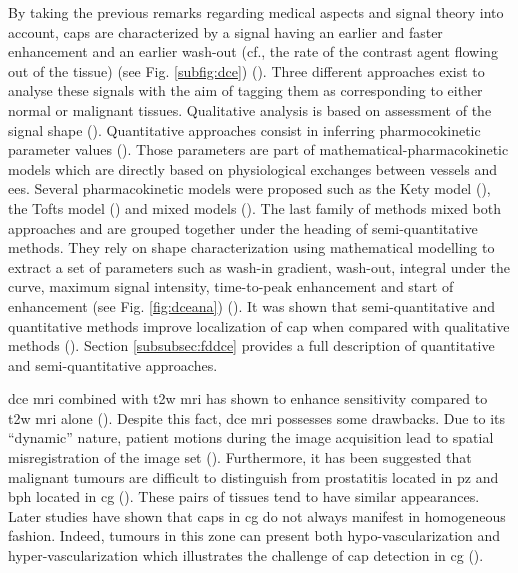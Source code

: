 \begin{enumerate}[leftmargin=*]
By taking the previous remarks regarding medical aspects and signal theory into account, \acp{cap} are characterized by a signal having an earlier and faster enhancement and an earlier wash-out (cf., the rate of the contrast agent flowing out of the tissue) (see Fig. \ref{subfig:dce}) (\cite{Verma2012}). Three different approaches exist to analyse these signals with the aim of tagging them as corresponding to either normal or malignant tissues. Qualitative analysis is based on assessment of the signal shape (\cite{Hoeks2011}). Quantitative approaches consist in inferring pharmocokinetic parameter values (\cite{Tofts2010}). Those parameters are part of mathematical-pharmacokinetic models which are directly based on physiological exchanges between vessels and \ac{ees}. Several pharmacokinetic models were proposed such as the Kety model (\cite{Kety1951}), the Tofts model (\cite{Tofts1997}) and mixed models (\cite{Larsson1996,StLawrence1998}). The last family of methods mixed both approaches and are grouped together under the heading of semi-quantitative methods. They rely on shape characterization using mathematical modelling to extract a set of parameters such as wash-in gradient, wash-out, integral under the curve, maximum signal intensity, time-to-peak enhancement and start of enhancement (see Fig. \ref{fig:dceana}) (\cite{Hoeks2011,Verma2012}). It was shown that semi-quantitative and quantitative methods improve localization of \ac{cap} when compared with qualitative methods (\cite{Rosenkrantz2013}). Section \ref{subsubsec:fddce} provides a full description of quantitative and semi-quantitative approaches.

\ac{dce} \ac{mri} combined with \ac{t2w} \ac{mri} has shown to enhance sensitivity compared to \ac{t2w} \ac{mri} alone (\cite{Jager1997,Kim2005,Schlemmer2004,Zelhof2009}). Despite this fact, \ac{dce} \ac{mri} possesses some drawbacks. Due to its ``dynamic'' nature, patient motions during the image acquisition lead to spatial misregistration of the image set (\cite{Verma2012}). Furthermore, it has been suggested that malignant tumours are difficult to distinguish from prostatitis located in \ac{pz} and \ac{bph} located in \ac{cg} (\cite{Hoeks2011,Verma2012}). These pairs of tissues tend to have similar appearances. Later studies have shown that \acp{cap} in \ac{cg} do not always manifest in homogeneous fashion. Indeed, tumours in this zone can present both hypo-vascularization and hyper-vascularization which illustrates the challenge of \ac{cap} detection in \ac{cg} (\cite{Niekerk2013}).


\end{enumerate}
